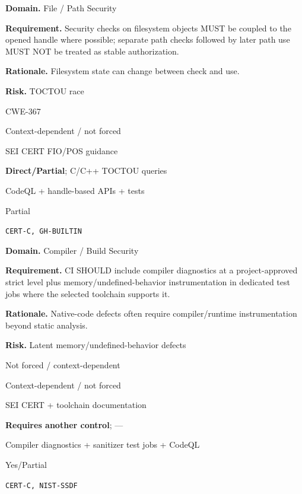\documentclass[10pt,letterpaper]{article}
\newcommand{\prioritybadge}[2]{\tcbox[on line,boxrule=0pt,arc=1.2mm,boxsep=0.7mm,left=1mm,right=1mm,top=0.4mm,bottom=0.4mm,colback=#2!12,coltext=#2]{\scriptsize\bfseries #1}}
\begin{document}
\begin{rulebox}[title={\texttt{SCS-C-FILE-001} \hfill \prioritybadge{High Priority}{High}}]
\textbf{Domain.} File / Path Security

\textbf{Requirement.} Security checks on filesystem objects MUST be coupled to the opened handle where possible; separate path checks followed by later path use MUST NOT be treated as stable authorization.

\textbf{Rationale.} Filesystem state can change between check and use.

\textbf{Risk.} TOCTOU race

\begin{description}[leftmargin=2.65cm,labelwidth=2.3cm,style=nextline,itemsep=1pt,topsep=3pt]
  \item[CWE] CWE-367
  \item[OWASP] Context-dependent / not forced
  \item[CERT] SEI CERT FIO/POS guidance
  \item[CodeQL] \textbf{Direct/Partial}; C/C++ TOCTOU queries
  \item[Enforcement] CodeQL + handle-based APIs + tests
  \item[Automation] Partial
  \item[Sources] \texttt{CERT-C, GH-BUILTIN}
\end{description}
\end{rulebox}

\begin{rulebox}[title={\texttt{SCS-C-BUILD-001} \hfill \prioritybadge{High Priority}{High}}]
\textbf{Domain.} Compiler / Build Security

\textbf{Requirement.} CI SHOULD include compiler diagnostics at a project-approved strict level plus memory/undefined-behavior instrumentation in dedicated test jobs where the selected toolchain supports it.

\textbf{Rationale.} Native-code defects often require compiler/runtime instrumentation beyond static analysis.

\textbf{Risk.} Latent memory/undefined-behavior defects

\begin{description}[leftmargin=2.65cm,labelwidth=2.3cm,style=nextline,itemsep=1pt,topsep=3pt]
  \item[CWE] Not forced / context-dependent
  \item[OWASP] Context-dependent / not forced
  \item[CERT] SEI CERT + toolchain documentation
  \item[CodeQL] \textbf{Requires another control}; ---
  \item[Enforcement] Compiler diagnostics + sanitizer test jobs + CodeQL
  \item[Automation] Yes/Partial
  \item[Sources] \texttt{CERT-C, NIST-SSDF}
\end{description}
\end{rulebox}
\end{document}
